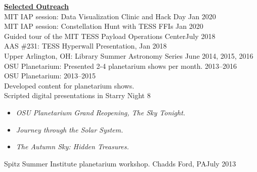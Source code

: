 \documentclass[letterpaper,11pt]{article}
\begin{document}
\noindent\underline{\textbf{Selected Outreach}}\\
MIT IAP session:  Data Visualization Clinic and Hack Day \hfill Jan 2020\\
MIT IAP session:  Constellation Hunt with TESS FFIs \hfill Jan 2020\\
Guided tour of the MIT TESS Payload Operations Center\hfill July 2018\\
AAS \#231:  TESS Hyperwall Presentation,  \hfill Jan 2018\\
Upper Arlington, OH:   Library Summer Astronomy Series \hfill June 2014, 2015, 2016\\
OSU Planetarium:  Presented 2-4 planetarium shows per month. \hfill 2013--2016\\
OSU Planetarium: \hfill2013--2015\\
\phantom{OS}Developed content for planetarium shows.\\
\phantom{OS}Scripted digital presentations in Starry Night 8
\begin{itemize}[nosep,label=\textbullet]
\item \textit{OSU Planetarium Grand Reopening, The Sky Tonight.}
\item \textit{Journey through the Solar System.}
\item \textit{The Autumn Sky:  Hidden Treasures.}
\end{itemize}
Spitz Summer Institute planetarium workshop. Chadds Ford, PA\hfill July 2013\\



\end{document}
